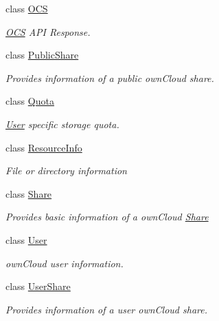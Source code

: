 \begin{DoxyCompactItemize}
class \hyperlink{classowncloudsharp_1_1_types_1_1_o_c_s}{O\+C\+S}
\begin{DoxyCompactList}\small\item\em \hyperlink{classowncloudsharp_1_1_types_1_1_o_c_s}{O\+C\+S} A\+P\+I Response. \end{DoxyCompactList}\item 
class \hyperlink{classowncloudsharp_1_1_types_1_1_public_share}{Public\+Share}
\begin{DoxyCompactList}\small\item\em Provides information of a public own\+Cloud share. \end{DoxyCompactList}\item 
class \hyperlink{classowncloudsharp_1_1_types_1_1_quota}{Quota}
\begin{DoxyCompactList}\small\item\em \hyperlink{classowncloudsharp_1_1_types_1_1_user}{User} specific storage quota. \end{DoxyCompactList}\item 
class \hyperlink{classowncloudsharp_1_1_types_1_1_resource_info}{Resource\+Info}
\begin{DoxyCompactList}\small\item\em File or directory information \end{DoxyCompactList}\item 
class \hyperlink{classowncloudsharp_1_1_types_1_1_share}{Share}
\begin{DoxyCompactList}\small\item\em Provides basic information of a own\+Cloud \hyperlink{classowncloudsharp_1_1_types_1_1_share}{Share} \end{DoxyCompactList}\item 
class \hyperlink{classowncloudsharp_1_1_types_1_1_user}{User}
\begin{DoxyCompactList}\small\item\em own\+Cloud user information. \end{DoxyCompactList}\item 
class \hyperlink{classowncloudsharp_1_1_types_1_1_user_share}{User\+Share}
\begin{DoxyCompactList}\small\item\em Provides information of a user own\+Cloud share. \end{DoxyCompactList}\end{DoxyCompactItemize}

